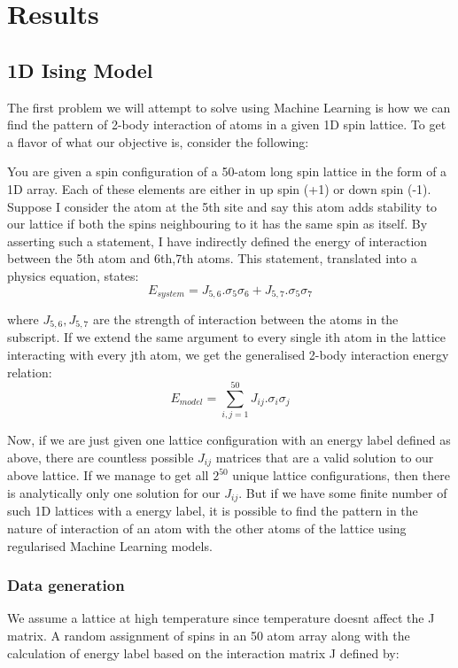 \section{Results}
\subsection{1D Ising Model}
The first problem we will attempt to solve using Machine Learning is how we can find the pattern of 2-body interaction of atoms in a given 1D spin lattice. To get a flavor of what our objective is, consider the following:

You are given a spin configuration of a 50-atom long spin lattice in the form of a 1D array. Each of these elements are either in up spin (+1) or down spin (-1). Suppose I consider the atom at the 5th site and say this atom adds stability to our lattice if both the spins neighbouring to it has the same spin as itself. By asserting such a statement, I have indirectly defined the energy of interaction between the 5th atom and 6th,7th atoms. This statement, translated into a physics equation, states: \[ E_{system}=J_{5,6}.\sigma_5\sigma_6+J_{5,7}.\sigma_5\sigma_7\]

where \(J_{5,6}, J_{5,7}\) are the strength of interaction between the atoms in the subscript. If we extend the same argument to every single ith atom in the lattice interacting with every jth atom, we get the generalised 2-body interaction energy relation: \[E_{model}=\sum_{i,j=1}^{50}J_{ij}.\sigma_i\sigma_j\]

Now, if we are just given one lattice configuration with an energy label defined as above, there are countless possible \(J_{ij}\) matrices that are a valid solution to our above lattice. If we manage to get all \(2^{50}\) unique lattice configurations, then there is analytically only one solution for our \(J_{ij}\). But if we have some finite number of such 1D lattices with a energy label, it is possible to find the pattern in the nature of interaction of an atom with the other atoms of the lattice using regularised Machine Learning models.

\subsubsection{Data generation}
We assume a lattice at high temperature since temperature doesnt affect the J matrix. A random assignment of spins in an 50 atom array along with the calculation of energy label based on the interaction matrix J defined by:

